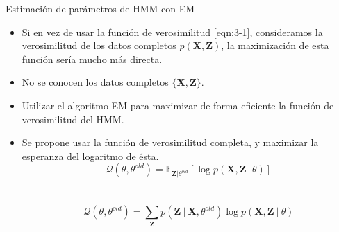 \begin{frame}{Estimación de parámetros de HMM con EM}
  \begin{itemize}      
    \itemsep1em
    \item Si en vez de usar la función de verosimilitud \eqref{eqn:3-1}, consideramos la verosimilitud de los datos completos $p(\mathbf{X}, \mathbf{Z})$, la maximización de esta función sería mucho más directa.

    \item No se conocen los datos completos $\lbrace \mathbf{X}, \mathbf{Z} \rbrace$.

    \item Utilizar el algoritmo EM para maximizar de forma eficiente la función de verosimilitud del HMM.
    \item Se propone usar la función de verosimilitud completa, y maximizar la esperanza 
      del logaritmo de ésta.
      \begin{equation}
        \mathcal{Q}(\theta, \theta^{old}) 
             = \mathbb{E}_{\mathbf{Z} | \theta^{old}} 
             \left[ \log p(\mathbf{X}, \mathbf{Z} \,|\, \theta) \right]       
      \end{equation}
      \\~\\
      \begin{equation}
        \mathcal{Q}(\theta, \theta^{old}) 
            = \sum_{\mathbf{Z}} p(\mathbf{Z} ~|~ \mathbf{X}, \theta^{old})
              \log p(\mathbf{X}, \mathbf{Z} ~|~ \theta)
      \end{equation}
      \vspace{.5em}      
  \end{itemize}
\end{frame}

